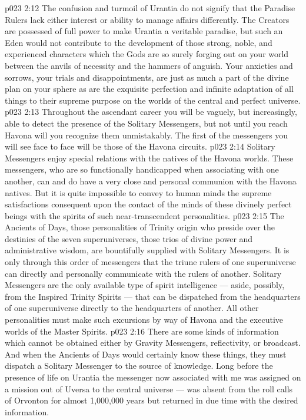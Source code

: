 \vs p023 2:12 The confusion and turmoil of Urantia do not signify that the Paradise Rulers lack either interest or ability to manage affairs differently. The Creators are possessed of full power to make Urantia a veritable paradise, but such an Eden would not contribute to the development of those strong, noble, and experienced characters which the Gods are so surely forging out on your world between the anvils of necessity and the hammers of anguish. Your anxieties and sorrows, your trials and disappointments, are just as much a part of the divine plan on your sphere as are the exquisite perfection and infinite adaptation of all things to their supreme purpose on the worlds of the central and perfect universe.
\vs p023 2:13 \bibnobreakspace {} Throughout the ascendant career you will be vaguely, but increasingly, able to detect the presence of the Solitary Messengers, but not until you reach Havona will you recognize them unmistakably. The first of the messengers you will see face to face will be those of the Havona circuits.
\vs p023 2:14 Solitary Messengers enjoy special relations with the natives of the Havona worlds. These messengers, who are so functionally handicapped when associating with one another, can and do have a very close and personal communion with the Havona natives. But it is quite impossible to convey to human minds the supreme satisfactions consequent upon the contact of the minds of these divinely perfect beings with the spirits of such near\hyp{}transcendent personalities.
\vs p023 2:15 \bibnobreakspace {} The Ancients of Days, those personalities of Trinity origin who preside over the destinies of the seven superuniverses, those trios of divine power and administrative wisdom, are bountifully supplied with Solitary Messengers. It is only through this order of messengers that the triune rulers of one superuniverse can directly and personally communicate with the rulers of another. Solitary Messengers are the only available type of spirit intelligence --- aside, possibly, from the Inspired Trinity Spirits --- that can be dispatched from the headquarters of one superuniverse directly to the headquarters of another. All other personalities must make such excursions by way of Havona and the executive worlds of the Master Spirits.
\vs p023 2:16 There are some kinds of information which cannot be obtained either by Gravity Messengers, reflectivity, or broadcast. And when the Ancients of Days would certainly know these things, they must dispatch a Solitary Messenger to the source of knowledge. Long before the presence of life on Urantia the messenger now associated with me was assigned on a mission out of Uversa to the central universe --- was absent from the roll calls of Orvonton for almost 1,000,000 years but returned in due time with the desired information.
